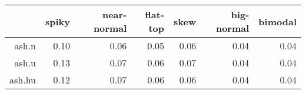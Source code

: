 \begin{tabular}{rrrrrrr}
  \toprule  & spiky & near-normal & flat-top & skew & big-normal & bimodal \\ 
  \midrule ash.n & 0.10 & 0.06 & 0.05 & 0.06 & 0.04 & 0.04 \\ 
  ash.u & 0.13 & 0.07 & 0.06 & 0.07 & 0.04 & 0.04 \\ 
  ash.hu & 0.12 & 0.07 & 0.06 & 0.06 & 0.04 & 0.04 \\ 
   \bottomrule \end{tabular}

